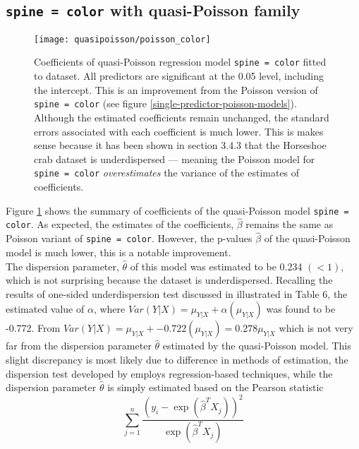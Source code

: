 \documentclass[a4paper, 12pt]{article}
\begin{document}
\subsection{\texttt{spine = color} with quasi-Poisson family}

\begin{figure}[H]
\begin{center}
\texttt{[image: quasipoisson/poisson\_color]}
\caption{Coefficients of quasi-Poisson regression model \texttt{spine = color}  fitted to dataset. All predictors are significant at the 0.05 level, including the intercept. This is an improvement from the Poisson version of \texttt{spine = color} (see figure \ref{single-predictor-poisson-models}). Although the estimated coefficients remain unchanged, the standard errors associated with each coefficient is much lower. This is makes sense because it has been shown in section 3.4.3 that the Horseshoe crab dataset is underdispersed --- meaning the Poisson model for \texttt{spine = color} \textit{overestimates} the variance of the estimates of coefficients. 
}
\label{quasipoisson_color}
\end{center}
\end{figure}

Figure \ref{quasipoisson_color} shows the summary of coefficients of the quasi-Poisson model \texttt{spine = color}. As expected, the estimates of the coefficients, $\hat{\beta}$ remains the same as Poisson variant of \texttt{spine = color}. However, the p-values $\hat{\beta}$ of the quasi-Poisson model is much lower, this is a notable improvement. \\
\indent The dispersion parameter, $\hat{\theta}$ of this model was estimated to be 0.234 $(< 1)$, which is not surprising because the dataset is underdispersed. Recalling the results of one-sided underdispersion test discussed in illustrated in Table 6, the estimated value of $\alpha$, where $Var(Y|X) = \mu_{Y|X} + \alpha(\mu_{Y|X})$ was found to be -0.772. From $Var(Y|X) = \mu_{Y|X} + -0.722(\mu_{Y|X}) = 0.278\mu_{Y|X}$ which is not very far from the dispersion parameter $\hat{\theta}$ estimated by the quasi-Poisson model. This slight discrepancy is most likely due to difference in methods of estimation, the dispersion test developed by \cite{cameron_trivedi_1990} employs regression-based techniques, while the dispersion parameter $\hat{\theta}$ is simply estimated based on the Pearson statistic $$ \sum_{j=1}^{n}{\frac{(y_i - \exp(\hat{\beta}^TX_j))^2}{\exp(\hat{\beta}^TX_j)}} $$
\end{document}
